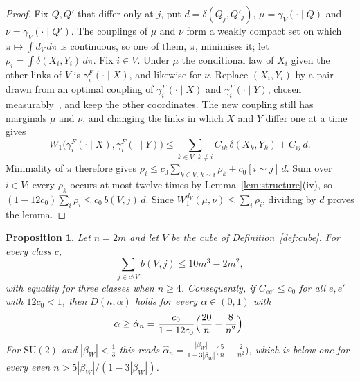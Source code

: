 \documentclass[aps,prd,twocolumn,superscriptaddress,nofootinbib,longbibliography,floatfix,amsmath,amssymb,10pt]{revtex4-2}
\newtheorem{proposition}[theorem]{Proposition}
\theoremstyle{definition}
\theoremstyle{remark}
\newcommand{\SU}{\mathrm{SU}}
\begin{document}
\begin{proof}
Fix $Q,Q'$ that differ only at $j$, put $d=\delta(Q_j,Q'_j)$,
$\mu=\gamma_V(\cdot\mid Q)$ and $\nu=\gamma_V(\cdot\mid Q')$. The couplings of
$\mu$ and $\nu$ form a weakly compact set on which $\pi\mapsto\int d_V\,d\pi$
is continuous, so one of them, $\pi$, minimises it; let
$\rho_i=\int\delta(X_i,Y_i)\,d\pi$. Fix $i\in V$. Under $\mu$ the conditional
law of $X_i$ given the other links of $V$ is $\gamma^F_i(\cdot\mid X)$, and
likewise for $\nu$. Replace $(X_i,Y_i)$ by a pair drawn from an optimal
coupling of $\gamma^F_i(\cdot\mid X)$ and $\gamma^F_i(\cdot\mid Y)$, chosen
measurably~\cite[Cor.~5.22]{Vil09}, and keep the other coordinates. The new
coupling still has marginals $\mu$ and $\nu$, and changing the links in which
$X$ and $Y$ differ one at a time gives
\[
W_1\bigl(\gamma^F_i(\cdot\mid X),\gamma^F_i(\cdot\mid Y)\bigr)\le
\sum_{k\in V,\,k\ne i}C_{ik}\,\delta(X_k,Y_k)+C_{ij}\,d .
\]
Minimality of $\pi$ therefore gives $\rho_i\le c_0\sum_{k\in V,\,k\sim
i}\rho_k+c_0[i\sim j]\,d$. Sum over $i\in V$: every $\rho_k$ occurs at most
twelve times by Lemma~\ref{lem:structure}(iv), so $(1-12c_0)\sum_i\rho_i\le
c_0\,b(V,j)\,d$. Since $W_1^{d_V}(\mu,\nu)\le\sum_i\rho_i$, dividing by $d$
proves the lemma.
\end{proof}

\begin{proposition}\label{prop:cubesmall}
Let $n=2m$ and let $V$ be the cube of Definition~\ref{def:cube}. For every
class $c$,
\[
\sum_{j\in c\setminus V}b(V,j)\le10m^3-2m^2 ,
\]
with equality for three classes when $n\ge4$. Consequently, if $C_{ee'}\le c_0$ for all
$e,e'$ with $12c_0<1$, then $D(n,\alpha)$ holds for every $\alpha\in(0,1)$
with
\[
\alpha\ge\hat\alpha_n=\frac{c_0}{1-12c_0}\Bigl(\frac{20}n-\frac8{n^2}\Bigr).
\]
For $\SU(2)$ and $|\beta_W|<\frac13$ this reads $\hat\alpha_n=
\frac{|\beta_W|}{1-3|\beta_W|}\bigl(\frac5n-\frac2{n^2}\bigr)$, which is below
one for every even $n>5|\beta_W|/(1-3|\beta_W|)$.
\end{proposition}
\end{document}
